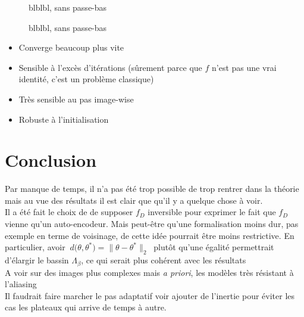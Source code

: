\documentclass[hidelinks, french]{article} %
\newcommand{\apriori}{\textit{a priori}}
\theoremstyle{enonce}
\theoremstyle{special}
\theoremstyle{rq}
\theoremstyle{exo}
\theoremstyle{demo}
\begin{document}
\begin{figure}[H]\centering
	
	\caption{blblbl, sans passe-bas}
	\label{fig:PGD}
\end{figure}

\begin{figure}[H]\centering
	
	\caption{blblbl, sans passe-bas}
	\label{fig:PGD}
\end{figure}

\begin{itemize}
	\item Converge beaucoup plus vite
	\item Sensible à l'excès d'itérations (sûrement parce que $f$ n'est pas une vrai identité, c'est un problème classique)
	\item Très sensible au pas image-wise
	\item Robuste à l'initialisation
\end{itemize}





\newpage



\section{Conclusion}

Par manque de temps, il n'a pas été trop possible de trop rentrer dans la théorie mais au vue des résultats il est clair que qu'il y a quelque chose à voir.  
\\
Il a été fait le choix de de supposer $f_D$ inversible pour exprimer le fait que $f_D$ vienne qu'un auto-encodeur. Mais peut-être qu'une formalisation moins dur, pas exemple en terme de voisinage, de cette idée pourrait être moins restrictive. En particulier, avoir $\ d\big(\theta, \theta^*\big)=\big\|\theta-\theta^*\big\|_2\ $ plutôt qu'une égalité permettrait d'élargir le bassin $\Lambda_\beta$, ce qui serait plus cohérent avec les résultats
\\

A voir sur des images plus complexes mais \apriori, les modèles très résistant à l'aliasing
\\

Il faudrait faire marcher le pas adaptatif voir ajouter de l'inertie pour éviter les cas les plateaux qui arrive de temps à autre.
\end{document}
